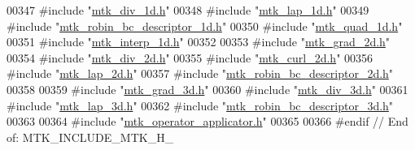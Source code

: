 \begin{DoxyCode}
00347 \textcolor{preprocessor}{#include "\hyperlink{mtk__div__1d_8h}{mtk\_div\_1d.h}"}
00348 \textcolor{preprocessor}{#include "\hyperlink{mtk__lap__1d_8h}{mtk\_lap\_1d.h}"}
00349 \textcolor{preprocessor}{#include "\hyperlink{mtk__robin__bc__descriptor__1d_8h}{mtk\_robin\_bc\_descriptor\_1d.h}"}
00350 \textcolor{preprocessor}{#include "\hyperlink{mtk__quad__1d_8h}{mtk\_quad\_1d.h}"}
00351 \textcolor{preprocessor}{#include "\hyperlink{mtk__interp__1d_8h}{mtk\_interp\_1d.h}"}
00352 
00353 \textcolor{preprocessor}{#include "\hyperlink{mtk__grad__2d_8h}{mtk\_grad\_2d.h}"}
00354 \textcolor{preprocessor}{#include "\hyperlink{mtk__div__2d_8h}{mtk\_div\_2d.h}"}
00355 \textcolor{preprocessor}{#include "\hyperlink{mtk__curl__2d_8h}{mtk\_curl\_2d.h}"}
00356 \textcolor{preprocessor}{#include "\hyperlink{mtk__lap__2d_8h}{mtk\_lap\_2d.h}"}
00357 \textcolor{preprocessor}{#include "\hyperlink{mtk__robin__bc__descriptor__2d_8h}{mtk\_robin\_bc\_descriptor\_2d.h}"}
00358 
00359 \textcolor{preprocessor}{#include "\hyperlink{mtk__grad__3d_8h}{mtk\_grad\_3d.h}"}
00360 \textcolor{preprocessor}{#include "\hyperlink{mtk__div__3d_8h}{mtk\_div\_3d.h}"}
00361 \textcolor{preprocessor}{#include "\hyperlink{mtk__lap__3d_8h}{mtk\_lap\_3d.h}"}
00362 \textcolor{preprocessor}{#include "\hyperlink{mtk__robin__bc__descriptor__3d_8h}{mtk\_robin\_bc\_descriptor\_3d.h}"}
00363 
00364 \textcolor{preprocessor}{#include "\hyperlink{mtk__operator__applicator_8h}{mtk\_operator\_applicator.h}"}
00365 
00366 \textcolor{preprocessor}{#endif // End of: MTK\_INCLUDE\_MTK\_H\_}
\end{DoxyCode}
